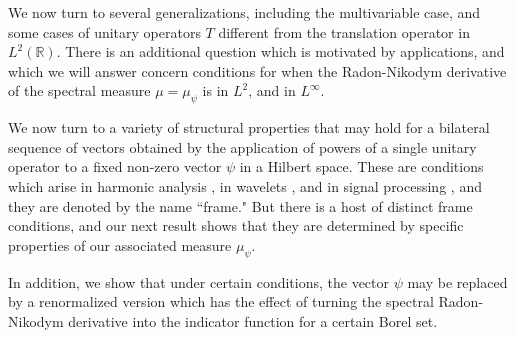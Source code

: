 \documentclass{birkmult}
\theoremstyle{definition}
\theoremstyle{remark}
\numberwithin{equation}{section}
\begin{document}
We now turn to several generalizations, including the multivariable case, 
and some cases of unitary operators $T$ different from the translation 
operator in $L^{2}(\mathbb{R})$. There is an additional question which is 
motivated by applications, and which we will answer concern conditions for 
when the Radon-Nikodym derivative of the spectral measure 
$\mu = \mu_{\psi}$ is in $L^{2}$, and in $L^{\infty}$. 

We now turn to a variety of structural properties that may hold for a 
bilateral sequence of vectors obtained by the application of powers of a 
single unitary operator to a fixed non-zero vector $\psi$ in a Hilbert 
space. These are conditions which arise in harmonic analysis \cite{Chr03}, 
in wavelets \cite{BMM99, Bag00, BJMP05}, and in signal processing 
\cite{CKS06}, and they are denoted by the name ``frame." But there is a 
host of distinct frame conditions, and our next result shows that they are 
determined by specific properties of our associated measure 
$\mu_{\psi}$. 

In addition, we show that under certain conditions, the vector $\psi$ may 
be replaced by a renormalized version which has the effect of turning the 
spectral Radon-Nikodym derivative into the indicator function for a certain 
Borel set.
\end{document}
